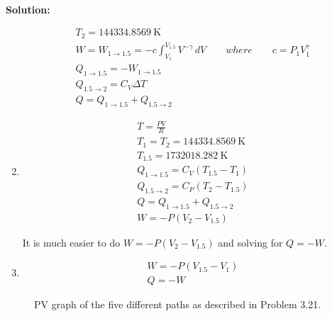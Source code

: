 \documentclass{article}
\newcommand*\widefbox[1]{\fbox{\vspace{0.5em}\hspace{2em}#1\hspace{2em}\vspace{0.5em}}}
\newenvironment{solution}{\par\noindent\textbf{\\Solution:\\}}{\par\medskip}
\begin{document}
\begin{solution}
\begin{enumerate}[label=(\alph*)]
\begin{gather*}
        T_{2}=144334.8569~\unit{ \kelvin }\\
        W=W_{1\to1.5} = -c\int_{V_{1}}^{V_{1.5}} V^{-\gamma }
        \, dV \qquad where
        \qquad c=P_{1}V_{1}^{\gamma }\\
        Q_{1\to1.5}=-W_{1\to1.5}\\
        Q_{1.5\to2}=C_{V}\Delta T\\
        Q=Q_{1\to1.5}+Q_{1.5\to2}
      \end{gather*}
    \item
      \begin{gather*}
        T=\frac{PV}{R}\\
        T_{1}=T_{2}=144334.8569~\unit{ \kelvin }\\
        T_{1.5}=1732018.282~\unit{ \kelvin }\\
        Q_{1\to1.5}=C_{V}(T_{1.5}-T_{1})\\
        Q_{1.5\to2}=C_{P}(T_{2}-T_{1.5})\\
        Q=Q_{1\to1.5}+Q_{1.5\to2}\\
        W=-P(V_{2}-V_{1.5})
      \end{gather*}
      It is much easier to do $W=-P(V_{2}-V_{1.5})$ and solving for $Q=-W$.
    \item
      \begin{gather*}
        W=-P(V_{1.5}-V_{1})\\
        Q=-W
      \end{gather*}
  \end{enumerate}
  \begin{figure}[h!]
    \centering
    \scalebox{0.5}{}
    \caption{
      PV graph of the five different paths as described in
      Problem 3.21.
    }
    \label{fig:s21}
  \end{figure}
\end{solution}
\end{document}
